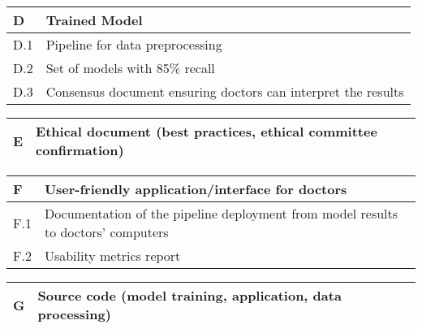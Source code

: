 \begin{center}
    \vspace{1em}
    \begin{tabular}{| >{\raggedright\arraybackslash}p{1cm}  | >{\raggedright\arraybackslash}p{13cm} |}
        \hline
        \rowcolor[HTML]{DCDCDC} D & Trained Model                                                 \\ \hline
        D.1                       & Pipeline for data preprocessing                               \\ \hline
        D.2                       & Set of models with 85\% recall                                \\ \hline
        D.3                       & Consensus document ensuring doctors can interpret the results \\ \hline
    \end{tabular}

    \vspace{1em}
    \begin{tabular}{| >{\raggedright\arraybackslash}p{1cm}  | >{\raggedright\arraybackslash}p{13cm} |}
        \hline
        \rowcolor[HTML]{DCDCDC} E & Ethical document (best practices, ethical committee confirmation) \\ \hline
    \end{tabular}

    \vspace{1em}
    \begin{tabular}{| >{\raggedright\arraybackslash}p{1cm}  | >{\raggedright\arraybackslash}p{13cm} |}
        \hline
        \rowcolor[HTML]{DCDCDC} F & User-friendly application/interface for doctors                                   \\ \hline
        F.1                       & Documentation of the pipeline deployment from model results to doctors' computers \\ \hline
        F.2                       & Usability metrics report                                                          \\ \hline
    \end{tabular}

    \vspace{1em}
    \begin{tabular}{| >{\raggedright\arraybackslash}p{1cm}  | >{\raggedright\arraybackslash}p{13cm} |}
        \hline
        \rowcolor[HTML]{DCDCDC} G & Source code (model training, application, data processing)            \\ \hline
    \end{tabular}


\end{center}
